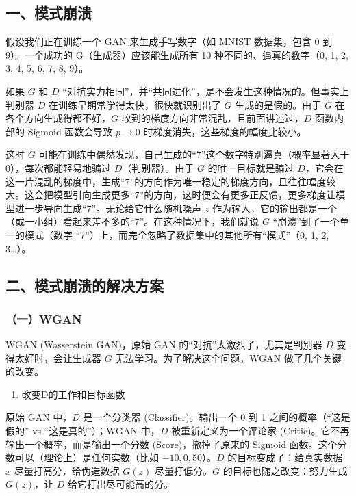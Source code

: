 \hypertarget{ux4e00ux6a21ux5f0fux5d29ux6e83}{%
\subsection{一、模式崩溃}\label{ux4e00ux6a21ux5f0fux5d29ux6e83}}

假设我们正在训练一个 GAN 来生成手写数字（如 MNIST 数据集，包含 0 到 9）。一个成功的 G（生成器）应该能生成所有 10 种不同的、逼真的数字（0, 1, 2, 3, 4, 5, 6, 7, 8, 9）。

如果 \(G\) 和 \(D\) ``对抗实力相同''，并``共同进化''，是不会发生这种情况的。但事实上判别器 \(D\) 在训练早期常学得太快，很快就识别出了 \(G\) 生成的是假的。由于 \(G\) 在各个方向生成得都不好，\(G\) 收到的梯度方向非常混乱，且前面讲述过，\(D\) 函数内部的 Sigmoid 函数会导致 \(p \to 0\) 时梯度消失，这些梯度的幅度比较小。

这时 \(G\) 可能在训练中偶然发现，自己生成的``7''这个数字特别逼真（概率显著大于 \(0\)），每次都能轻易地骗过 \(D\)（判别器）。由于 \(G\) 的唯一目标就是骗过 \(D\)，它会在这一片混乱的梯度中，生成``7''的方向作为唯一稳定的梯度方向，且往往幅度较大。这会把模型引向生成更多``7''的方向，这时便会有更多正反馈，更多梯度让模型进一步导向生成``7''。无论给它什么随机噪声 \(z\) 作为输入，它的输出都是一个（或一小组）看起来差不多的``7''。在这种情况下，我们就说 \(G\) ``崩溃''到了一个单一的模式（数字 ``7''）上，而完全忽略了数据集中的其他所有``模式''（0, 1, 2, 3\ldots）。

\hypertarget{ux4e8cux6a21ux5f0fux5d29ux6e83ux7684ux89e3ux51b3ux65b9ux6848}{%
\subsection{二、模式崩溃的解决方案}\label{ux4e8cux6a21ux5f0fux5d29ux6e83ux7684ux89e3ux51b3ux65b9ux6848}}

\hypertarget{ux4e00wgan}{%
\subsubsection{（一）WGAN}\label{ux4e00wgan}}

WGAN (Wasserstein GAN)，原始 GAN 的``对抗''太激烈了，尤其是判别器 \(D\) 变得太好时，会让生成器 \(G\) 无法学习。为了解决这个问题，WGAN 做了几个关键的改变。

\begin{enumerate}
\def\labelenumi{\arabic{enumi}.}
\tightlist
\item
  改变D的工作和目标函数
\end{enumerate}

原始 GAN 中，\(D\) 是一个分类器 (Classifier)。输出一个 0 到 1 之间的概率（``这是假的'' vs ``这是真的''）；WGAN 中，\(D\) 被重新定义为一个评论家 (Critic)。它不再输出一个概率，而是输出一个分数 (Score)，撤掉了原来的 Sigmoid 函数。这个分数可以（理论上）是任何实数（比如 \(-10, 0, 50\)）。\(D\) 的目标变成了：给真实数据 \(x\) 尽量打高分，给伪造数据 \(G(z)\) 尽量打低分。\(G\) 的目标也随之改变：努力生成 \(G(z)\)，让 \(D\) 给它打出尽可能高的分。


